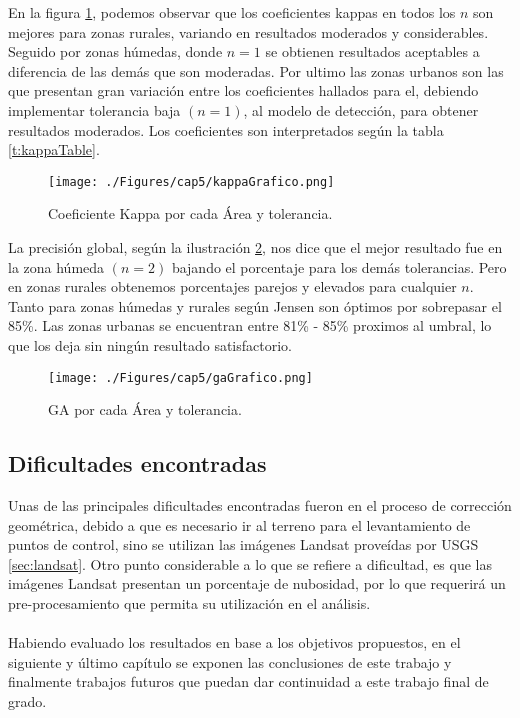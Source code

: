 En la figura \ref{fig:kappaGrafico}, podemos observar que los coeficientes kappas en todos los $ n  $ son mejores para zonas rurales, variando en resultados moderados y considerables. Seguido por zonas h\'umedas, donde $ n=1 $ se obtienen resultados aceptables a diferencia de las dem\'as que son moderadas. Por ultimo las zonas urbanos son las que presentan gran variaci\'on entre los coeficientes hallados para el, debiendo implementar tolerancia baja $(n=1)$, al modelo de detecci\'on, para obtener resultados moderados. Los coeficientes son interpretados seg\'un la tabla \ref{t:kappaTable}.
\begin{figure}[H]
	\centering
	\texttt{[image: ./Figures/cap5/kappaGrafico.png]}
	\caption{Coeficiente Kappa por cada \'Area y tolerancia.}
	\label{fig:kappaGrafico}
\end{figure}
La precisi\'on global, seg\'un la ilustraci\'on \ref{fig:gaGrafico}, nos dice que el mejor resultado fue en la zona h\'umeda $ (n=2) $ bajando el porcentaje para los dem\'as tolerancias. Pero en zonas rurales obtenemos porcentajes parejos y elevados para cualquier $ n $. Tanto para zonas h\'umedas y rurales seg\'un Jensen \cite{jensen1981urban} son \'optimos por sobrepasar el 85\%. Las zonas urbanas se encuentran entre 81\% - 85\% proximos al umbral, lo que los deja sin ning\'un resultado satisfactorio.
\begin{figure}[H]
	\centering
	\texttt{[image: ./Figures/cap5/gaGrafico.png]}
	\caption{GA por cada \'Area y tolerancia.}
	\label{fig:gaGrafico}
\end{figure}

\subsection{Dificultades encontradas} 
Unas de las principales dificultades encontradas fueron en el proceso de correcci\'on geom\'etrica, debido a que es necesario ir al terreno para el levantamiento de puntos de control, sino se utilizan las im\'agenes Landsat prove\'idas por USGS \ref{sec:landsat}. Otro punto considerable a lo que se refiere a dificultad, es que las im\'agenes Landsat presentan un porcentaje de nubosidad, por lo que requerir\'a un pre-procesamiento que permita su utilizaci\'on en el an\'alisis.\\~\\
Habiendo evaluado los resultados en base a los objetivos propuestos, en el siguiente y \'ultimo cap\'itulo se exponen las conclusiones de este trabajo  y finalmente trabajos futuros que puedan dar continuidad a este trabajo final de grado.